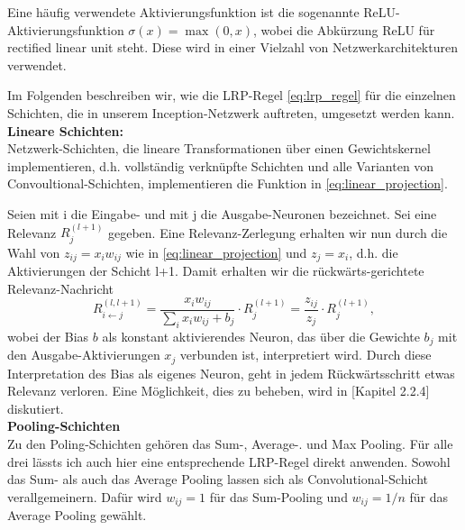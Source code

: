 \documentclass[11pt,a4paper]{article}
\numberwithin{equation}{section}
\begin{document}
	 Eine häufig verwendete Aktivierungsfunktion ist die sogenannte ReLU-Aktivierungsfunktion  $\sigma(x) = \max{(0,x)}$, wobei die Abkürzung ReLU für rectified linear unit steht.
	 Diese wird in einer Vielzahl von Netzwerkarchitekturen verwendet.
	 
	 Im Folgenden beschreiben wir, wie die LRP-Regel \autoref{eq:lrp_regel} für die einzelnen Schichten, die in unserem Inception-Netzwerk auftreten, umgesetzt werden kann.\\
	 
	 \noindent\textbf{Lineare Schichten:}\\
	 Netzwerk-Schichten, die lineare Transformationen über einen Gewichtskernel implementieren, d.h. vollständig verknüpfte Schichten und alle Varianten von Convoultional-Schichten, implementieren die Funktion in \autoref{eq:linear_projection}.
	 
	 Seien mit i die Eingabe- und mit j die Ausgabe-Neuronen bezeichnet. Sei eine Relevanz $R_j^{(l+1)}$ gegeben. Eine Relevanz-Zerlegung erhalten wir nun durch die Wahl von $z_{ij}=x_iw_{ij}$ wie in \autoref{eq:linear_projection} und $z_j = x_i$, d.h. die Aktivierungen der Schicht l+1. Damit erhalten wir die rückwärts-gerichtete Relevanz-Nachricht 
	 \begin{equation}
	 	R_{i\leftarrow j}^{(l,l+1)} = \frac{x_iw_{ij}}{\sum_i{x_iw_{ij}+b_j}}\cdot R_j^{(l+1)} = \frac{z_{ij}}{z_j}\cdot R_j^{(l+1)},
	 \end{equation}
	wobei der Bias $b$ als konstant aktivierendes Neuron, das über die Gewichte $b_j$ mit den Ausgabe-Aktivierungen $x_j$ verbunden ist, interpretiert wird.
	Durch diese Interpretation des Bias als eigenes Neuron, geht in jedem Rückwärtsschritt etwas Relevanz verloren. Eine Möglichkeit, dies zu beheben, wird in \cite{lapuschkin}[Kapitel 2.2.4] diskutiert.\\
	
	
	
	\noindent\textbf{Pooling-Schichten}\\
	Zu den Poling-Schichten gehören das Sum-, Average-. und Max Pooling. Für alle drei lässts ich auch hier eine entsprechende LRP-Regel direkt anwenden.
	Sowohl das Sum- als auch das Average Pooling lassen sich als Convolutional-Schicht verallgemeinern. Dafür wird $w_{ij}=1$ für das Sum-Pooling und $w_{ij}=1/n$ für das Average Pooling gewählt.
	
\end{document}
